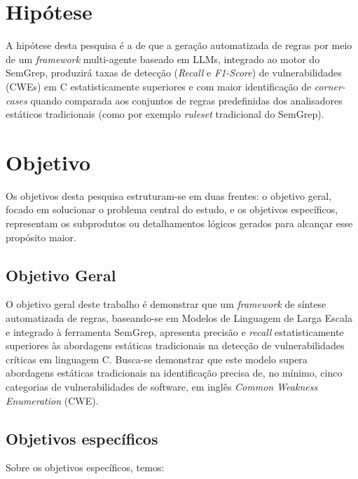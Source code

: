 \documentclass[
    12pt,                %
    openright,           %
    oneside,             %
    a4paper,             %
    english,             %
    brazil               %
]{abntex2}
\begin{document}
\section{Hipótese}
\label{sec:hipotese}
\par
A hipótese desta pesquisa é a de que a geração automatizada de regras por meio de um \textit{framework} multi-agente baseado em LLMs, integrado ao motor do SemGrep, produzirá taxas de detecção (\textit{Recall} e \textit{F1-Score}) de vulnerabilidades (CWEs) em C estatisticamente superiores e com maior identificação de \textit{corner-cases} quando comparada aos conjuntos de regras predefinidas dos analisadores estáticos tradicionais (como por exemplo \textit{ruleset} tradicional do SemGrep).

\section{Objetivo}
\label{sec:objetivo}
\par
Os objetivos desta pesquisa estruturam-se em duas frentes: o objetivo geral, focado em solucionar o problema central do estudo, e os objetivos específicos, representam os subprodutos ou detalhamentos lógicos gerados para alcançar esse propósito maior.

\subsection{Objetivo Geral}
\label{sec:objgeral}
\par
O objetivo geral deste trabalho é demonstrar que um \textit{framework} de síntese automatizada de regras, baseando-se em Modelos de Linguagem de Larga Escala e integrado à ferramenta SemGrep, apresenta precisão e \textit{recall} estatisticamente superiores às abordagens estáticas tradicionais na detecção de vulnerabilidades críticas em linguagem C.
Busca-se demonstrar que este modelo supera abordagens estáticas tradicionais na identificação precisa de, no mínimo, cinco categorias de vulnerabilidades de software, em inglês \textit{Common Weakness Enumeration} (CWE).

\subsection{Objetivos específicos}
\label{sec:objespecifico}
\par
Sobre os objetivos específicos, temos:
\end{document}
